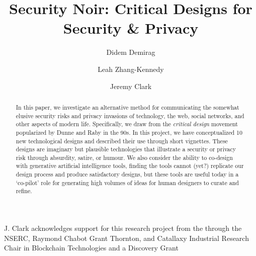 \documentclass[sigchi]{acmart}
\begin{document}
\title{Security Noir: Critical Designs for Security \& Privacy}

\author{Didem Demirag}

\author{Leah Zhang-Kennedy}

\author{Jeremy Clark}

\begin{abstract}

In this paper, we investigate an alternative method for communicating the somewhat elusive security risks and privacy invasions of technology, the web, social networks, and other aspects of modern life. Specifically, we draw from the \textit{critical design} movement popularized by Dunne and Raby in the 90s. In this project, we have conceptualized 10 new technological designs and described their use through short vignettes. These designs are imaginary but plausible technologies that illustrate a security or privacy risk through absurdity, satire, or humour. We also consider the ability to co-design with generative artificial intelligence tools, finding the tools cannot (yet?) replicate our design process and produce satisfactory designs, but these tools are useful today in a `co-pilot' role for generating high volumes of ideas for human designers to curate and refine. 

\end{abstract}

\maketitle






\begin{anonsuppress}
\begin{acks}
%
J. Clark acknowledges support for this research project from the  through the NSERC, Raymond Chabot Grant Thornton, and Catallaxy Industrial Research Chair in Blockchain Technologies  and a Discovery Grant 
%
%
\end{acks}
\end{anonsuppress}




\end{document}
